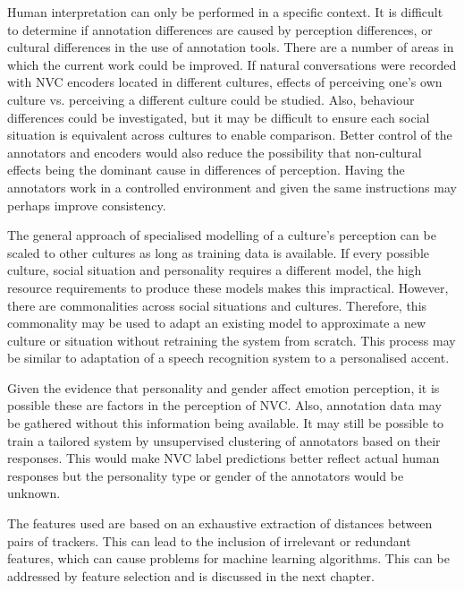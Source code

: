 Human interpretation can only be performed in a specific context. 
It is difficult to determine if annotation differences are caused by perception differences, or cultural differences in the use of annotation tools. 
There are a number of areas in which the current work could be improved. If natural conversations were recorded with \ac{NVC} encoders located in different cultures, effects of perceiving one's own culture vs. perceiving a different culture could be studied. Also, behaviour differences could be investigated, but it may be difficult to ensure each social situation is  equivalent across cultures to enable comparison. Better control of the annotators and encoders would also reduce the possibility that non-cultural effects being the dominant cause in differences of perception. Having the annotators work in a controlled environment and given the same instructions may perhaps improve consistency.

The general approach of specialised modelling of a culture's perception can be scaled to other cultures as long as training data is available. If every possible culture, social situation and personality requires a different model, the high resource requirements to produce these models makes this impractical. However, there are commonalities across social situations and cultures. Therefore, this commonality may be used to adapt an existing model to approximate a new culture or situation without retraining the system from scratch. This process may be similar to adaptation of a speech recognition system to a personalised accent.

Given the evidence that personality and gender affect emotion perception, it is possible these are factors in the perception of \ac{NVC}. Also, annotation data may be gathered without this information being available. It may still be possible to train a tailored system by unsupervised clustering of annotators based on their responses. This would make \ac{NVC} label predictions better reflect actual human responses but the personality type or gender of the annotators would be unknown. %

The features used are based on an exhaustive extraction of distances between pairs of trackers. This can lead to the inclusion of irrelevant or redundant features, which can cause problems for machine learning algorithms. This can be addressed by feature selection and is discussed in the next chapter.
